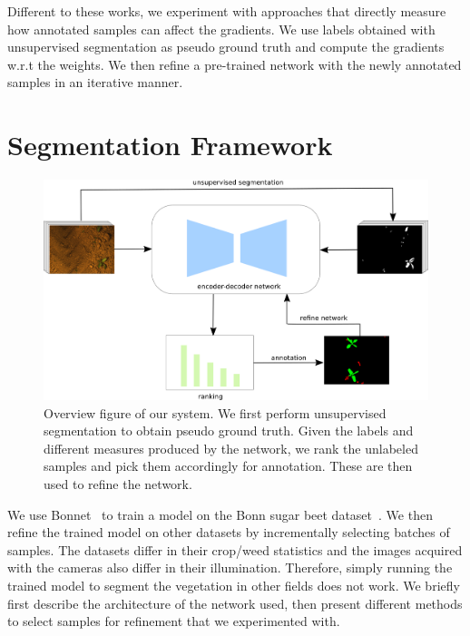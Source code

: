 \documentclass[letterpaper, 10 pt, conference]{ieeeconf}  %
\begin{document}
Different to these works, we experiment with approaches that directly measure how annotated samples can affect the gradients. We use labels obtained with unsupervised segmentation as pseudo ground truth and compute the gradients w.r.t the weights. We then refine a pre-trained network with the newly annotated samples in an iterative manner. 




\section{Segmentation Framework} \label{sec:approach}


    \begin{figure}
    \centering
    \includegraphics[scale=0.9]{pics/output_system_overview.pdf}
   		\caption{Overview figure of our system. We first perform unsupervised segmentation to obtain pseudo ground truth. Given the labels and different measures produced by the network, we rank the unlabeled samples and pick them accordingly for annotation. These are then used to refine the network.}
		\label{fig:overview}    		
   \end{figure}


We use Bonnet~\cite{milioto2018bonnet} to train a model on the Bonn sugar beet dataset~\cite{chebrolu2017agricultural}. We then refine the trained model on other datasets by incrementally selecting batches of samples. The datasets differ in their crop/weed statistics and the images acquired with the cameras also differ in their illumination. Therefore, simply running the trained model to segment the vegetation in other fields does not work. We briefly first describe the architecture of the network used, then present different methods to select samples for refinement that we experimented with.
\end{document}
